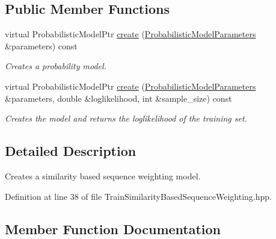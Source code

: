 \subsection*{Public Member Functions}
\begin{DoxyCompactItemize}
\item 
virtual Probabilistic\+Model\+Ptr \hyperlink{classtops_1_1TrainSimilarityBasedSequenceWeighting_afccb17be7a84c13a4e7166a583b3597e}{create} (\hyperlink{classtops_1_1ProbabilisticModelParameters}{Probabilistic\+Model\+Parameters} \&parameters) const
\begin{DoxyCompactList}\small\item\em Creates a probability model. \end{DoxyCompactList}\item 
\mbox{\label{classtops_1_1TrainSimilarityBasedSequenceWeighting_a6a0848bca907b5bc0b05df0cd58db440}} 
virtual Probabilistic\+Model\+Ptr \hyperlink{classtops_1_1TrainSimilarityBasedSequenceWeighting_a6a0848bca907b5bc0b05df0cd58db440}{create} (\hyperlink{classtops_1_1ProbabilisticModelParameters}{Probabilistic\+Model\+Parameters} \&parameters, double \&loglikelihood, int \&sample\+\_\+size) const
\begin{DoxyCompactList}\small\item\em Creates the model and returns the loglikelihood of the training set. \end{DoxyCompactList}\end{DoxyCompactItemize}


\subsection{Detailed Description}
Creates a similarity based sequence weighting model. 

Definition at line 38 of file Train\+Similarity\+Based\+Sequence\+Weighting.\+hpp.



\subsection{Member Function Documentation}
\mbox{\label{classtops_1_1TrainSimilarityBasedSequenceWeighting_afccb17be7a84c13a4e7166a583b3597e}} 
